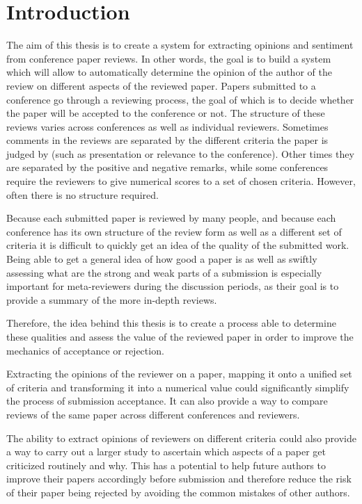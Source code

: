 \chapter*{Introduction}
The aim of this thesis is to create a system for extracting opinions and sentiment from conference paper reviews. In other words, the goal is to build a system which will allow to automatically determine the opinion of the author of the review on different aspects of the reviewed paper.
Papers submitted to a conference go through a reviewing process, the goal of which is to decide whether the paper will be accepted to the conference or not. The structure of these reviews varies across conferences as well as individual reviewers. Sometimes comments in the reviews are separated by the different criteria the paper is judged by (such as presentation or relevance to the conference). Other times they are separated by the positive and negative remarks, while some conferences require the reviewers to give numerical scores to a set of chosen criteria. However, often there is no structure required.

Because each submitted paper is reviewed by many people, and because each conference has its own structure of the review form as well as a different set of criteria it is difficult to quickly get an idea of the quality of the submitted work. Being able to get a general idea of how good a paper is as well as swiftly assessing what are the strong and weak parts of a submission is especially important for meta-reviewers during the discussion periods, as their goal is to provide a summary of the more in-depth reviews. 

 Therefore, the idea behind this thesis is to create a process able to determine these qualities and assess the value of the reviewed paper in order to improve the mechanics of acceptance or rejection.

Extracting the opinions of the reviewer on a paper, mapping it onto a unified set of criteria and transforming it into a numerical value could significantly simplify the process of submission acceptance. It can also provide a way to compare reviews of the same paper across different conferences and reviewers.

The ability to extract opinions of reviewers on different criteria could also provide a way to carry out a larger study to ascertain which aspects of a paper get criticized routinely and why. This has a potential to help future authors to improve their papers accordingly before submission and therefore reduce the risk of their paper being rejected by avoiding the common mistakes of other authors.

